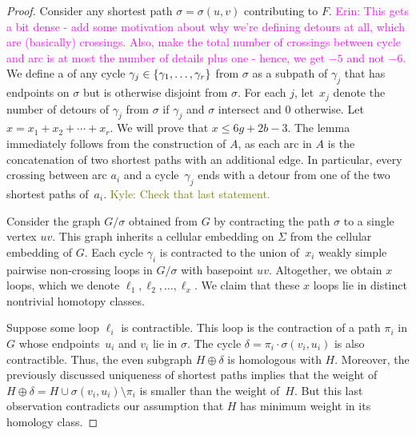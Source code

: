 \documentclass[letterpaper,review]{siamart190516}
\def\anote#1{\color{purple}Amir: #1 \color{black}}
\def\rnote#1{\color{red}Review: #1 \color{black}}
\def\knote#1{\textcolor{olive}{Kyle: #1}}
\def\enote#1{\textcolor{magenta}{Erin: #1}}
\begin{document}
\begin{proof}
\medskip
Consider any shortest path \(\sigma = \sigma(u, v)\) contributing to \(F\).
\enote{This gets a bit dense - add some motivation about why we're defining detours at all, which are (basically) crossings.  Also, make the total number of crossings between cycle and arc is at most the number of details plus one - hence, we get $-5$ and not $-6$.}
We define a  of any cycle \(\gamma_j \in \left\{ \gamma_1, \dots, \gamma_r \right\}\) from
\(\sigma\) as a subpath of \(\gamma_j\) that has endpoints on \(\sigma\) but is otherwise disjoint
from \(\sigma\).
For each $j$, let~$x_j$ denote the number of detours of \(\gamma_j\) from $\sigma$ if \(\gamma_j\)
and \(\sigma\) intersect and \(0\) otherwise.
Let $x = x_1 + x_2 + \cdots + x_r$.
We will prove that $x\le 6g+2b-3$.
The lemma immediately follows from the construction of $A$, as each arc in $A$ is the concatenation
of two shortest paths with an additional edge.
In particular, every crossing between arc \(a_i\) and a cycle~\(\gamma_j\) ends with a detour from
one of the two shortest paths of~\(a_i\).
\knote{Check that last statement.}

Consider the graph $G/\sigma$ obtained from $G$ by contracting the path $\sigma$ to a single vertex $uv$.
This graph inherits a cellular embedding on $\Sigma$ from the cellular embedding of $G$.
Each cycle $\gamma_i$ is contracted to the union of~$x_i$ weakly simple pairwise non-crossing loops
in $G/\sigma$ with basepoint $uv$.
Altogether, we obtain $x$ loops, which we denote $\ell_1, \ell_2, \dots, \ell_x$.
We claim that these $x$ loops lie in distinct nontrivial homotopy classes.

Suppose some loop $\ell_i$ is contractible.  This loop is the contraction of a path $\pi_i$ in $G$
whose endpoints~$u_i$ and $v_i$ lie in $\sigma$.  The cycle $\delta = \pi_i \cdot \sigma(v_i,u_i)$
is also contractible.  Thus, the even subgraph $H\oplus\delta$ is homologous with $H$.  Moreover,
the previously discussed uniqueness of shortest paths implies that the weight of $H\oplus\delta = H \cup \sigma(v_i,u_i) \setminus \pi_i$ is smaller than the weight of~$H$.
But this last observation contradicts our assumption that $H $ has minimum weight in its homology
class.


\end{proof}
\end{document}
